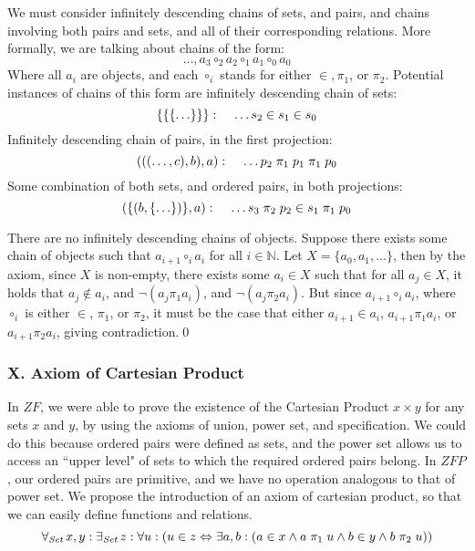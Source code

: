 \documentclass[11pt]{report}
\newcommand{\all}[1]{\forall_{\mathit{#1}}\hspace{0.5mm}}
\newcommand{\ex}[1]{\exists_{\mathit{#1}}\hspace{0.5mm}}
\newcommand{\pleft}{\mathrel{\pi_1}}
\newcommand{\pright}{\mathrel{\pi_2}}
\theoremstyle{definition}
\theoremstyle{theorem}
\theoremstyle{lemma}
\begin{document}
\noindent
We must consider infinitely descending chains of sets, and pairs, and chains involving both pairs and sets, and all of their corresponding relations.
More formally, we are talking about chains of the form:
$$\ldots, a_3 \mathrel{\circ_2} a_2 \mathrel{\circ_1} a_1 \mathrel{\circ_0} a_0$$
Where all $a_i$ are objects, and each $\circ_i$ stands for either $\in, \pleft$, or $\pright$. Potential instances of chains of this form are infinitely descending chain of sets:
  $$\{\{\{\ldots\}\}\}:\hspace{4mm}\ldots s_2 \in s_1 \in s_0$$
Infinitely descending chain of pairs, in the first projection:
  $$(((\ldots, c),b),a):\hspace{4mm}\ldots p_2 \pleft p_1 \pleft p_0$$
Some combination of both sets, and ordered pairs, in both projections:
  $$(\{(b, \{\ldots\})\}, a):\hspace{4mm}\ldots s_3 \pright p_2 \in s_1 \pleft p_0$$

\theorem There are no infinitely descending chains of objects.
\proof Suppose there exists some chain of objects such that $a_{i+1} \mathrel{\circ_i} a_i$ for all $i\in\mathbb{N}$. Let $X = \{a_0, a_1, \ldots\}$, then by the axiom, since $X$ is non-empty, there exists some $a_i \in X$ such that for all $a_j\in X$, it holds that $a_j \notin a_i$, and $\neg(a_j\pleft a_i)$, and $\neg (a_j\pright a_i)$.
But since $a_{i+1} \mathrel{\circ_i} a_i$,
where $\mathrel{\circ_i}$ is either $\in$, $\pleft$, or $\pright$, it must be the case that either $a_{i+1} \in a_i$, $a_{i+1}\pleft a_i$, or $a_{i+1}\pright a_i$, giving contradiction.\qed

\subsubsection*{X. Axiom of Cartesian Product}
In $\mathit{ZF}$, we were able to prove the existence of the Cartesian Product $x \times y$ for any sets $x$ and $y$, by using the axioms of union, power set, and specification.
We could do this because ordered pairs were defined as sets, and the power set allows us to access an ``upper level" of sets to which the required ordered pairs belong.
In $\mathit{ZFP}$, our ordered pairs are primitive, and we have no operation analogous to that of power set.
We propose the introduction of an axiom of cartesian product, so that we can easily define functions and relations.
$$\all{Set} x,y: \ex{Set} z:
 \forall u: (u \in z \Leftrightarrow
 \exists a,b: (a \in x \wedge a\pleft u \wedge b\in y \wedge b\pright u))$$
\end{document}
